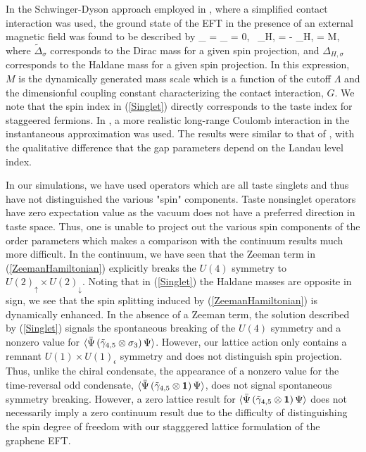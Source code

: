 \documentclass[aps,prd,twocolumn,showpacs,superscriptaddress,groupedaddress]{revtex4}  %
\begin{document}
In the Schwinger-Dyson approach employed in \cite{MiranskyGraphene2}, where a simplified contact interaction was used, the ground state of the EFT in the presence of an external magnetic field was found to be described by
\beq
\label{Singlet}
\tilde{\Delta}_{\uparrow} = \tilde{\Delta}_{\downarrow} = 0, ~\Delta_{H,\uparrow} = - \Delta_{H,\downarrow} = M,
\eeq
where $\tilde{\Delta}_{\sigma}$ corresponds to the Dirac mass for a given spin projection, and $\Delta_{H,\sigma}$ corresponds to the Haldane mass for a given spin projection. In this expression, $M$ is the dynamically generated mass scale which is a function of the cutoff $\Lambda$ and the dimensionful coupling constant characterizing the contact interaction, $G$. We note that the spin index in (\ref{Singlet}) directly corresponds to the taste index for staggeered fermions. In \cite{MiranskyGraphene3}, a more realistic long-range Coulomb interaction in the instantaneous approximation was used. The results were similar to that of \cite{MiranskyGraphene2}, with the qualitative difference that the gap parameters depend on the Landau level index.

In our simulations, we have used operators which are all taste singlets and thus have not distinguished the various "spin" components. Taste nonsinglet operators have zero expectation value as the vacuum does not have a preferred direction in taste space. Thus, one is unable to project out the various spin components of the order parameters which makes a comparison with the continuum results much more difficult. In the continuum, we have seen that the Zeeman term in (\ref{ZeemanHamiltonian}) explicitly breaks the $U(4)$ symmetry to $U(2)_{\uparrow} \times U(2)_{\downarrow}$. Noting that in (\ref{Singlet}) the Haldane masses are opposite in sign, we see that the spin splitting induced by (\ref{ZeemanHamiltonian}) is dynamically enhanced. In the absence of a Zeeman term, the solution described by (\ref{Singlet}) signals the spontaneous breaking of the $U(4)$ symmetry and a nonzero value for ${\langle  {\bar \Psi} \left( \tilde{\gamma}_{4,5} \otimes \sigma_3 \right) \Psi \rangle}$. However, our lattice action only contains a remnant $U(1) \times U(1)_{\epsilon}$ symmetry and does not distinguish spin projection. Thus, unlike the chiral condensate, the appearance of a nonzero value for the time-reversal odd condensate, ${\langle {\bar \Psi} \left( \tilde{\gamma}_{4,5} \otimes \bm 1 \right) \Psi \rangle}$, does not signal spontaneous symmetry breaking. However, a zero lattice result for ${\langle {\bar \Psi} \left( \tilde{\gamma}_{4,5} \otimes \bm 1 \right) \Psi \rangle}$ does not necessarily imply a zero continuum result due to the difficulty of distinguishing the spin degree of freedom with our stagggered lattice formulation of the graphene EFT. 
\end{document}
